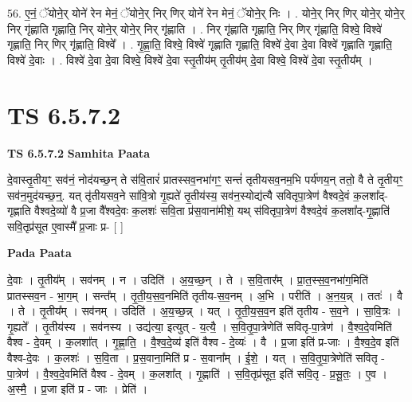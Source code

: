 \documentclass[17pt]{extarticle}
\begin{document}
56. ए॒नं॒ ॅयोने॒र् योने॑ रेन मेनं॒ ॅयोने॒र् निर् णिर् योने॑ रेन मेनं॒ ॅयोने॒र् निः । . योने॒र् निर् णिर् योने॒र् योने॒र् निर् गृ॑ह्णाति गृह्णाति॒ निर् योने॒र् योने॒र् निर् गृ॑ह्णाति । . निर् गृ॑ह्णाति गृह्णाति॒ निर् णिर् गृ॑ह्णाति॒ विश्वे॒ विश्वे॑ गृह्णाति॒ निर् णिर् गृ॑ह्णाति॒ विश्वे᳚ । . गृ॒ह्णा॒ति॒ विश्वे॒ विश्वे॑ गृह्णाति गृह्णाति॒ विश्वे॑ दे॒वा दे॒वा विश्वे॑ गृह्णाति गृह्णाति॒ विश्वे॑ दे॒वाः । . विश्वे॑ दे॒वा दे॒वा विश्वे॒ विश्वे॑ दे॒वा स्तृ॒तीय॑म् तृ॒तीय॑म् दे॒वा विश्वे॒ विश्वे॑ दे॒वा स्तृ॒तीय᳚म् । \newline
\pagebreak
{}

\section{ TS 6.5.7.2 }

\textbf{TS 6.5.7.2 } \newline
\textbf{Samhita Paata} \newline

दे॒वास्तृ॒तीयꣳ॒॒ सव॑नं॒ नोद॑यच्छ॒न् ते स॑वि॒तारं॑ प्रातस्सव॒नभा॑गꣳ॒॒ सन्तं॑ तृतीयसव॒नम॒भि पर्य॑णय॒न् ततो॒ वै ते तृ॒तीयꣳ॒॒ सव॑न॒मुद॑यच्छ॒न्॒. यत् तृ॑तीयसव॒ने सा॑वि॒त्रो गृ॒ह्यते॑ तृ॒तीय॑स्य॒ सव॑न॒स्योद्य॑त्यै सवितृपा॒त्रेण॑ वैश्वदे॒वं क॒लशा᳚द्-गृह्णाति वैश्वदे॒व्यो॑ वै प्र॒जा वै᳚श्वदे॒वः क॒लशः॑ सवि॒ता प्र॑स॒वाना॑मीशे॒ यथ् स॑वितृपा॒त्रेण॑ वैश्वदे॒वं क॒लशा᳚द्-गृ॒ह्णाति॑ सवि॒तृप्र॑सूत ए॒वास्मै᳚ प्र॒जाः प्र- [  ] \newline

\textbf{Pada Paata} \newline

दे॒वाः । तृ॒तीय᳚म् । सव॑नम् । न । उदिति॑ । अ॒य॒च्छ॒न् । ते । स॒वि॒तार᳚म् । प्रा॒त॒स्स॒व॒नभा॑ग॒मिति॑ प्रातस्सव॒न - भा॒ग॒म् । सन्त᳚म् । तृ॒ती॒य॒स॒व॒नमिति॑ तृतीय-स॒व॒नम् । अ॒भि । परीति॑ । अ॒न॒य॒न्न् । ततः॑ । वै । ते । तृ॒तीय᳚म् । सव॑नम् । उदिति॑ । अ॒य॒च्छ॒न्न् । यत् । तृ॒ती॒य॒स॒व॒न इति॑ तृतीय - स॒व॒ने । सा॒वि॒त्रः । गृ॒ह्यते᳚ । तृ॒तीय॑स्य । सव॑नस्य । उद्य॑त्या॒ इत्युत् - य॒त्यै॒ । स॒वि॒तृ॒पा॒त्रेणेति॑ सवितृ-पा॒त्रेण॑ । वै॒श्व॒दे॒वमिति॑ वैश्व - दे॒वम् । क॒लशा᳚त् । गृ॒ह्णा॒ति॒ । वै॒श्व॒दे॒व्य॑ इति॑ वैश्व - दे॒व्यः॑ । वै । प्र॒जा इति॑ प्र-जाः । वै॒श्व॒दे॒व इति॑ वैश्व-दे॒वः । क॒लशः॑ । स॒वि॒ता । प्र॒स॒वाना॒मिति॑ प्र - स॒वाना᳚म् । ई॒शे॒ । यत् । स॒वि॒तृ॒पा॒त्रेणेति॑ सवितृ - पा॒त्रेण॑ । वै॒श्व॒दे॒वमिति॑ वैश्व - दे॒वम् । क॒लशा᳚त् । गृ॒ह्णाति॑ । स॒वि॒तृप्र॑सूत॒ इति॑ सवि॒तृ - प्र॒सू॒तः॒ । ए॒व । अ॒स्मै॒ । प्र॒जा इति॑ प्र - जाः । प्रेति॑ ।  \newline
\end{document}
